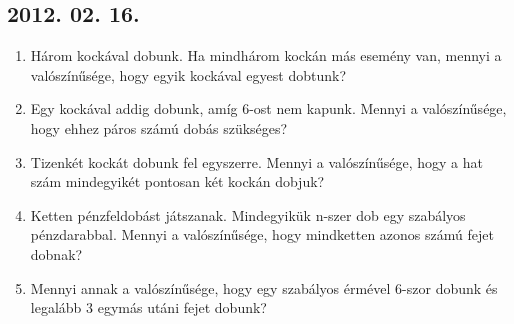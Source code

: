\documentclass{article}
\begin{document}
\subsection*{2012. 02. 16.}
\begin{enumerate}
\item
Három kockával dobunk. Ha mindhárom kockán más esemény van, mennyi a valószínűsége, hogy egyik kockával egyest dobtunk?
\item
Egy kockával addig dobunk, amíg 6-ost nem kapunk. Mennyi a valószínűsége, hogy ehhez páros számú dobás szükséges?
\item
Tizenkét kockát dobunk fel egyszerre. Mennyi a valószínűsége, hogy a hat szám mindegyikét pontosan két kockán dobjuk?
\item
Ketten pénzfeldobást játszanak. Mindegyikük n-szer dob egy szabályos pénzdarabbal. Mennyi a valószínűsége, hogy mindketten azonos számú fejet dobnak?
\item
Mennyi annak a valószínűsége, hogy egy szabályos érmével 6-szor dobunk és legalább 3 egymás utáni fejet dobunk?
\end{enumerate}
\end{document}
